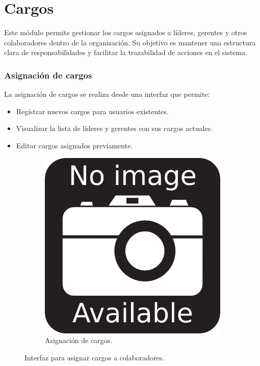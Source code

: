 \chapter{Cargos}

Este módulo permite gestionar los cargos asignados a líderes, gerentes y otros colaboradores dentro de la organización. Su objetivo es mantener una estructura clara de responsabilidades y facilitar la trazabilidad de acciones en el sistema.

\subsection{Asignación de cargos}

La asignación de cargos se realiza desde una interfaz que permite:

\begin{itemize}
    \item Registrar nuevos cargos para usuarios existentes.
    \item Visualizar la lista de líderes y gerentes con sus cargos actuales.
    \item Editar cargos asignados previamente.
\end{itemize}

\begin{figure}[h]
\centering
\begin{subfigure}{0.4\textwidth}
    \includegraphics[width=\textwidth]{imgs/no-image.png}
    \caption{Asignación de cargos.}
    \label{fig:cargos1}
\end{subfigure}
\caption{Interfaz para asignar cargos a colaboradores.}
\end{figure}

